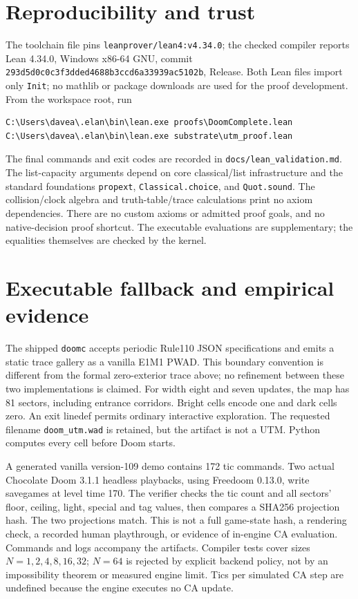 \documentclass[11pt]{article}
\begin{document}
\section{Reproducibility and trust}
The toolchain file pins \texttt{leanprover/lean4:v4.34.0}; the checked compiler
reports Lean 4.34.0, Windows x86-64 GNU, commit
\texttt{293d5d0c0c3f3dded4688b3ccd6a33939ac5102b}, Release.
Both Lean files import only \texttt{Init}; no mathlib or package downloads
are used for the proof development. From the workspace root, run
\begin{verbatim}
C:\Users\davea\.elan\bin\lean.exe proofs\DoomComplete.lean
C:\Users\davea\.elan\bin\lean.exe substrate\utm_proof.lean
\end{verbatim}
The final commands and exit codes are recorded in
\texttt{docs/lean\_validation.md}. The list-capacity arguments depend on core
classical/list infrastructure and the standard foundations
\texttt{propext}, \texttt{Classical.choice}, and \texttt{Quot.sound}.
The collision/clock algebra and truth-table/trace calculations print no axiom
dependencies. There are no custom axioms or admitted proof goals, and no
native-decision proof shortcut. The executable evaluations are supplementary;
the equalities themselves are checked by the kernel.

\section{Executable fallback and empirical evidence}
The shipped \texttt{doomc} accepts periodic Rule110 JSON specifications and
emits a static trace gallery as a vanilla E1M1 PWAD. This boundary convention
is different from the formal zero-exterior trace above; no refinement between
these two implementations is claimed. For width eight and seven updates,
the map has 81 sectors, including entrance corridors. Bright cells encode one
and dark cells zero. An exit linedef permits ordinary interactive exploration.
The requested filename \texttt{doom\_utm.wad} is retained, but the artifact is
not a UTM. Python computes every cell before Doom starts.

A generated vanilla version-109 demo contains 172 tic commands. Two actual
Chocolate Doom 3.1.1 headless playbacks, using Freedoom 0.13.0, write savegames
at level time 170. The verifier checks the tic count and all sectors' floor,
ceiling, light, special and tag values, then compares a SHA256 projection hash.
The two projections match. This is not a full game-state hash, a rendering
check, a recorded human playthrough, or evidence of in-engine CA evaluation.
Commands and logs accompany the artifacts. Compiler tests cover sizes
$N=1,2,4,8,16,32$; $N=64$ is rejected by explicit backend policy, not by an
impossibility theorem or measured engine limit. Tics per simulated CA step
are undefined because the engine executes no CA update.
\end{document}
